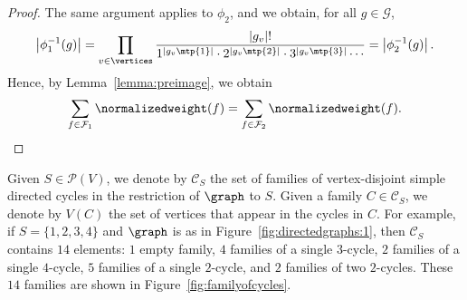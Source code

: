 \begin{proof}
    The same argument applies to \(\phi_2\),
    and we obtain, for all \(g \in \mathcal{G}\),
    \begin{equation*}
        \left| \phi_1^{-1}(g) \right| =
        \prod_{v \in \vertices} \frac{\left| g_v \right|!}{1^{\left| g_v\mtp{1} \right|} \cdot 2^{\left| g_v\mtp{2} \right|} \cdot 3^{\left| g_v\mtp{3} \right|} \cdots} =
        \left| \phi_2^{-1}(g) \right|.
    \end{equation*}
    Hence, by Lemma~\ref{lemma:preimage}, we obtain 
    \begin{equation*}
        \sum_{f \in \mathcal{F}_1} \normalizedweight(f)
        = \sum_{f \in \mathcal{F}_2} \normalizedweight(f). \qedhere
    \end{equation*}
\end{proof}

Given \(S \in \mathcal{P}(V)\),
we denote by \(\mathcal{C}_S\) the set of families of vertex-disjoint simple directed cycles in the restriction of \(\graph\) to \(S\).
Given a family \(C \in \mathcal{C}_S\),
we denote by \(V(C)\) the set of vertices that appear in the cycles in \(C\).
For example, if \(S = \{1, 2, 3, 4\}\) and \(\graph\) is as in Figure~\ref{fig:directedgraphs:1},
then \(\mathcal{C}_S\) contains \(14\) elements:
\(1\) empty family,
\(4\) families of a single \(3\)-cycle,
\(2\) families of a single \(4\)-cycle,
\(5\) families of a single \(2\)-cycle,
and \(2\) families of two \(2\)-cycles.
These \(14\) families are shown in Figure~\ref{fig:familyofcycles}.

